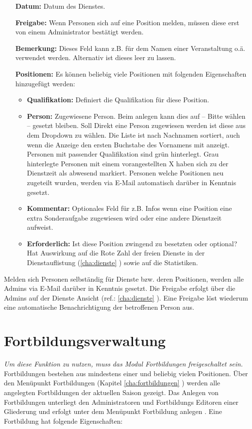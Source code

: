 \begin{itemize}
	\item[\textbf{Datum:}] Datum des Dienstes.
	\item[\textbf{Freigabe:}] Wenn Personen sich auf eine Position melden, müssen diese erst von einem Administrator bestätigt werden.
	\item[\textbf{Bemerkung:}] Dieses Feld kann z.B. für dem Namen einer Veranstaltung o.ä. verwendet werden. Alternativ ist dieses leer zu lassen.
	\item[\textbf{Positionen:}] Es können beliebig viele Positionen mit folgenden Eigenschaften hinzugefügt werden:
	\begin{itemize}
		\item \textbf{Qualifikation:} Definiert die Qualifikation für diese Position.
		\item \textbf{Person:} Zugewiesene Person. Beim anlegen kann dies auf \glqq -- Bitte wählen -- \grqq{} gesetzt bleiben. Soll Direkt eine Person zugewiesen werden ist diese aus dem Dropdown zu wählen. Die Liste ist nach Nachnamen sortiert, auch wenn die Anzeige den ersten Buchstabe des Vornamens mit anzeigt. Personen mit passender Qualifikation sind grün hinterlegt. Grau hinterlegte Personen mit einem vorangestellten X haben sich zu der Dienstzeit als abwesend markiert. Personen welche Positionen neu zugeteilt wurden, werden via E-Mail automatisch darüber in Kenntnis gesetzt.
		\item \textbf{Kommentar:} Optionales Feld für z.B. Infos wenn eine Position eine extra Sonderaufgabe zugewiesen wird oder eine andere Dienstzeit aufweist.
		\item \textbf{Erforderlich:} Ist diese Position zwingend zu besetzten oder optional? Hat Auswirkung auf die Rote Zahl der freien Dienste in der Dienstauflistung (\ref{cha:dienste} ) sowie auf die Statistiken.
	\end{itemize}
\end{itemize}
Melden sich Personen selbständig für Dienste bzw. deren Positionen, werden alle Admins via E-Mail darüber in Kenntnis gesetzt. Die Freigabe erfolgt über die Admins auf der Dienste Ansicht (ref.: \ref{cha:dienste} ). Eine Freigabe löst wiederum eine automatische Benachrichtigung der betroffenen Person aus.

\section{Fortbildungsverwaltung}
\label{sec:admin_training}
\textit{{\small Um diese Funktion zu nutzen, muss das Modul Fortbildungen freigeschaltet sein.}}
Fortbildungen bestehen aus mindestens einer und beliebig vielen Positionen. Über den Menüpunkt Fortbildungen (Kapitel \ref{cha:fortbildungen} ) werden alle angelegten Fortbildungen der aktuellen Saison gezeigt. Das Anlegen von Fortbildungen unterliegt den Administratoren und Fortbildungs Editoren einer Gliederung und erfolgt unter dem Menüpunkt \glqq Fortbildung anlegen \grqq{}. Eine Fortbildung hat folgende Eigenschaften:

